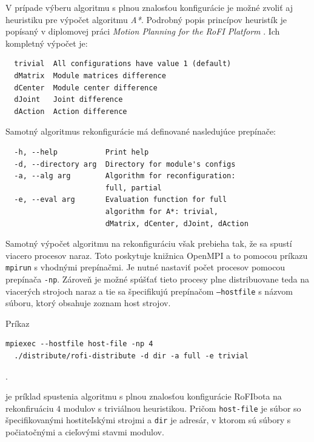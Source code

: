 \documentclass[
  digital, %
  oneside, %
  table,   %
  lof,     %
  nolot,     %
]{fithesis3}
\begin{document}
V prípade výberu algoritmu s plnou znalosťou konfigurácie je možné zvoliť aj heuristiku pre výpočet algoritmu \textit{A*}. Podrobný popis princípov heuristík je popísaný v diplomovej práci \textit{Motion Planning for the RoFI Platform} \cite{vozarovaMasterThesis}. Ich kompletný výpočet je: 

\begin{verbatim}
  trivial  All configurations have value 1 (default)
  dMatrix  Module matrices difference
  dCenter  Module center difference
  dJoint   Joint difference
  dAction  Action difference
\end{verbatim}

Samotný algoritmus rekonfigurácie má definované nasledujúce prepínače: 

\begin{verbatim}
  -h, --help           Print help
  -d, --directory arg  Directory for module's configs
  -a, --alg arg        Algorithm for reconfiguration: 
                       full, partial
  -e, --eval arg       Evaluation function for full 
                       algorithm for A*: trivial, 
                       dMatrix, dCenter, dJoint, dAction
\end{verbatim}

Samotný výpočet algoritmu na rekonfiguráciu však prebieha tak, že sa spustí viacero procesov naraz. Toto poskytuje knižnica OpenMPI a to pomocou príkazu \texttt{mpirun} s vhodnými prepínačmi. Je nutné nastaviť počet procesov pomocou prepínača \texttt{-np}. Zároveň je možné spúšťať tieto procesy plne distribuovane teda na viacerých strojoch naraz a tie sa špecifikujú prepínačom \texttt{--hostfile} \cite{openMPIHostFile} s názvom súboru, ktorý obsahuje zoznam host strojov. 

Príkaz

\begin{verbatim}
mpiexec --hostfile host-file -np 4 
  ./distribute/rofi-distribute -d dir -a full -e trivial
\end{verbatim}.

je príklad spustenia algoritmu s plnou znalosťou konfigurácie RoFIbota na rekonfiruáciu $4$ modulov s triviálnou heuristikou. Pričom \texttt{host-file} je súbor so špecifikovanými hostiteľskými strojmi a \texttt{dir} je adresár, v ktorom sú súbory s počiatočnými a cieľovými stavmi modulov. 
\end{document}
